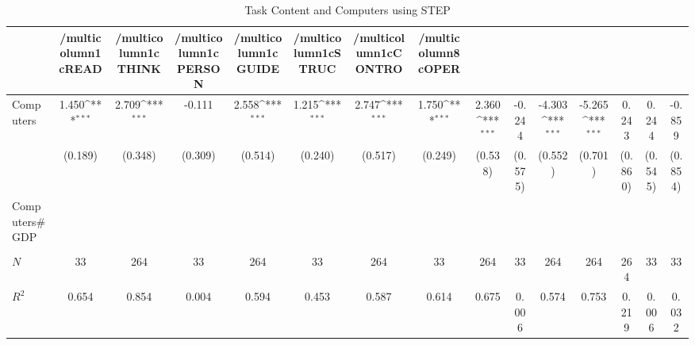 \begin{table}[htbp]\centering
\def\sym#1{\ifmmode^{#1}\else\(^{#1}\)\fi}
\caption{Task Content and Computers using STEP}
\begin{tabular}{l*{14}{c}}
\hline\hline
            &/multicolumn{1}{c}{READ}&/multicolumn{1}{c}{THINK}&/multicolumn{1}{c}{PERSON}&/multicolumn{1}{c}{GUIDE}&/multicolumn{1}{c}{STRUC}&/multicolumn{1}{c}{CONTRO}&/multicolumn{8}{c}{OPER}                                                                                                                                                       \\
\hline
Computers   &       1.450\sym{***}&       2.709\sym{***}&      -0.111         &       2.558\sym{***}&       1.215\sym{***}&       2.747\sym{***}&       1.750\sym{***}&       2.360\sym{***}&      -0.244         &      -4.303\sym{***}&      -5.265\sym{***}&       0.243         &       0.244         &      -0.859         \\
            &     (0.189)         &     (0.348)         &     (0.309)         &     (0.514)         &     (0.240)         &     (0.517)         &     (0.249)         &     (0.538)         &     (0.575)         &     (0.552)         &     (0.701)         &     (0.860)         &     (0.545)         &     (0.854)         \\
[1em]
Computers#GDP&                     &                     &                     &                     &                     &                     &                     &                     &                     &                     &                     &                     &                     &                     \\
            &                     &                     &                     &                     &                     &                     &                     &                     &                     &                     &                     &                     &                     &                     \\
\hline
\(N\)       &          33         &         264         &          33         &         264         &          33         &         264         &          33         &         264         &          33         &         264         &         264         &         264         &          33         &          33         \\
\(R^{2}\)   &       0.654         &       0.854         &       0.004         &       0.594         &       0.453         &       0.587         &       0.614         &       0.675         &       0.006         &       0.574         &       0.753         &       0.219         &       0.006         &       0.032         \\
\hline\hline
\end{tabular}
\end{table}
